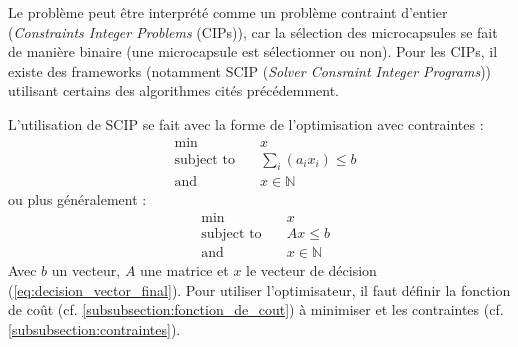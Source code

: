 Le problème peut être interprété comme un problème contraint d'entier (\textit{Constraints Integer Problems} (CIPs)), car la sélection des \glspl{microcapsule} se fait de manière binaire (une \gls{microcapsule} est sélectionner ou non). Pour les CIPs, il existe des frameworks (notamment SCIP (\textit{Solver Consraint Integer Programs})) utilisant certains des algorithmes cités précédemment.

L'utilisation de SCIP se fait avec la forme de l'optimisation avec contraintes :
\begin{align*}
    &\min\quad &x \\
    &\text{subject to}\quad &\sum_{i}\left( a_ix_i\right) \leq b \\
    &\text{and}\quad &x \in \mathbb{N}
\end{align*}
ou plus généralement : 
\begin{align*}
    &\min\quad &x \\
    &\text{subject to}\quad &Ax \leq b \\
    &\text{and}\quad &x \in \mathbb{N}
\end{align*}
Avec $b$ un vecteur, $A$ une matrice et $x$ le vecteur de décision (\cf \autoref{eq:decision_vector_final}). Pour utiliser l'optimisateur, il faut définir la fonction de coût (cf. \autoref{subsubsection:fonction_de_cout}) à minimiser et les contraintes (cf. \autoref{subsubsection:contraintes}).

